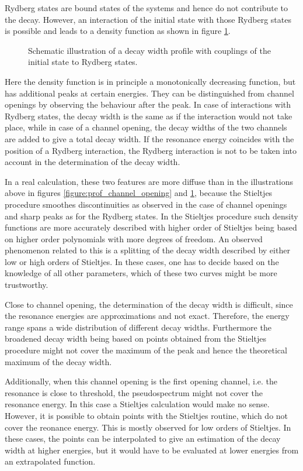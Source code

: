 Rydberg states are bound states of the systems and hence do not contribute
to the decay. However, an interaction of the initial state with those
Rydberg states is possible and leads to a density function as shown in
figure \ref{figure:prof_rydberg}.

\begin{figure}[h]
  \centering
  
  \caption{Schematic illustration of a decay width profile with couplings
           of the initial state to Rydberg states.}
  \label{figure:prof_rydberg}
\end{figure}
Here the density function is in principle a monotonically decreasing function,
but has additional peaks at certain energies. They can be distinguished from
channel openings by observing the behaviour after the peak. In case of
interactions with Rydberg states, the decay width is the same as if the interaction
would not take place, while in case of a channel opening, the decay widths
of the two channels are added to give a total decay width.
If the resonance energy coincides with the position of a Rydberg interaction,
the Rydberg interaction is not to be taken into account in the determination
of the decay width.

In a real calculation, these two features are more diffuse than in the
illustrations above in
figures \ref{figure:prof_channel_opening}
and \ref{figure:prof_rydberg}, because the Stieltjes procedure smoothes
discontinuities as observed in the case of channel openings and sharp peaks
as for the Rydberg states.
In the Stieltjes procedure such density functions are more accurately described
with higher order of Stieltjes being based on higher order polynomials
with more degrees of freedom.
An observed phenomenon related to this is
a splitting of the decay width described by either low or high orders of Stieltjes.
In these cases, one has to decide based on the knowledge of all other
parameters, which of these two curves might be more trustworthy.

Close to channel opening, the determination of the decay width is difficult, since
the resonance energies are approximations and not exact. Therefore, the
energy range spans a wide distribution of different decay widths. Furthermore
the broadened decay width being based on points obtained from the Stieltjes
procedure might not cover the maximum of the peak and hence the theoretical
maximum of the decay width.

Additionally, when this channel opening is the first opening channel, i.e. the
resonance is close to threshold, the pseudospectrum might not cover the resonance energy.
In this case a Stieltjes calculation would make no sense. However, it is possible
to obtain points with the Stieltjes routine, which do not cover the reonance energy.
This is mostly observed for low orders of Stieltjes. In these cases, the points
can be interpolated to give an estimation of the decay width at higher energies,
but it would have to be evaluated at lower energies from an extrapolated function.

